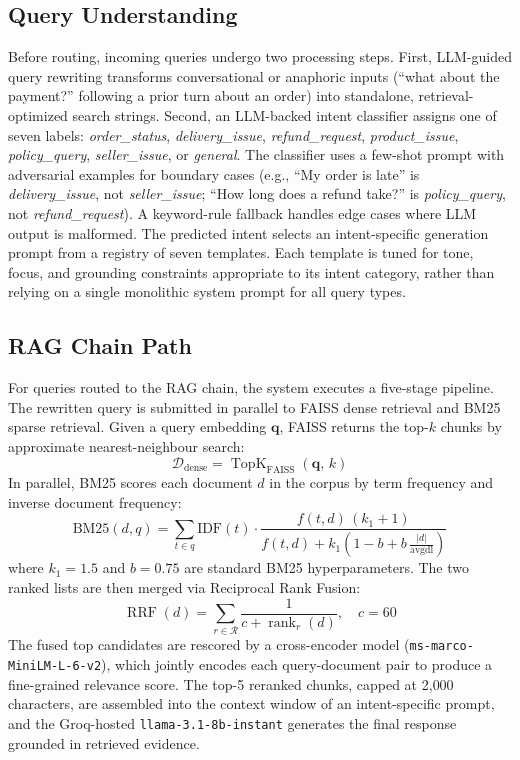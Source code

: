 \documentclass[conference]{IEEEtran}
\begin{document}
\subsection{Query Understanding}
Before routing, incoming queries undergo two processing steps. First, LLM-guided
query rewriting transforms conversational or anaphoric inputs (``what about the
payment?'' following a prior turn about an order) into standalone, retrieval-optimized
search strings. Second, an LLM-backed intent classifier assigns one of seven labels:
\textit{order\_status}, \textit{delivery\_issue}, \textit{refund\_request},
\textit{product\_issue}, \textit{policy\_query}, \textit{seller\_issue}, or
\textit{general}. The classifier uses a few-shot prompt with adversarial examples for
boundary cases (e.g., ``My order is late'' is \textit{delivery\_issue}, not
\textit{seller\_issue}; ``How long does a refund take?'' is \textit{policy\_query},
not \textit{refund\_request}). A keyword-rule fallback handles edge cases where LLM
output is malformed. The predicted intent selects an intent-specific generation
prompt from a registry of seven templates. Each template is tuned for tone, focus,
and grounding constraints appropriate to its intent category, rather than relying
on a single monolithic system prompt for all query types.

\subsection{RAG Chain Path}
For queries routed to the RAG chain, the system executes a five-stage pipeline.
The rewritten query is submitted in parallel to FAISS dense retrieval and BM25
sparse retrieval. Given a query embedding $\mathbf{q}$, FAISS returns the top-$k$
chunks by approximate nearest-neighbour search:
\[
\mathcal{D}_{\text{dense}} = \operatorname{TopK}_{\text{FAISS}}(\mathbf{q},\, k)
\]
In parallel, BM25 scores each document $d$ in the corpus by term frequency and
inverse document frequency:
\[
\text{BM25}(d, q) = \sum_{t \in q} \text{IDF}(t) \cdot
\frac{f(t,d)\,(k_1+1)}{f(t,d) + k_1\!\left(1-b+b\,\tfrac{|d|}{\text{avgdl}}\right)}
\]
where $k_1 = 1.5$ and $b = 0.75$ are standard BM25 hyperparameters.
The two ranked lists are then merged via Reciprocal Rank Fusion:
\[
\operatorname{RRF}(d) = \sum_{r \in \mathcal{R}} \frac{1}{c + \operatorname{rank}_r(d)}, \quad c = 60
\]
The fused top candidates are rescored by a cross-encoder model
(\texttt{ms-marco-MiniLM-L-6-v2}), which jointly encodes each query-document pair
to produce a fine-grained relevance score. The top-5 reranked chunks, capped at
2{,}000 characters, are assembled into the context window of an intent-specific
prompt, and the Groq-hosted \texttt{llama-3.1-8b-instant} generates the final
response grounded in retrieved evidence.
\end{document}

